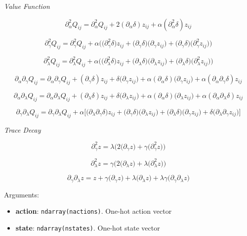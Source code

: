 \emph{Value Function}

\[
\partial^2_\alpha Q_{ij} = \partial^2_\alpha Q_{ij} + 2(\partial_\alpha \delta) z_{ij} + \alpha (\partial^2_\alpha \delta) z_{ij}
\]

\[
\partial^2_\gamma Q_{ij} = \partial^2_\gamma Q_{ij} +  \alpha \Big( \big(\partial^2_\gamma \delta \big)z_{ij} +  \big(\partial_\gamma \delta \big) \big(\partial_\gamma z_{ij}\big) + \big(\partial_\gamma \delta \big) \big(\partial^2_\gamma z_{ij}\big) \Big)
\]

\[
\partial^2_\lambda Q_{ij} = \partial^2_\lambda Q_{ij} +  \alpha \Big( \big(\partial^2_\lambda \delta \big)z_{ij} +  \big(\partial_\lambda \delta \big) \big(\partial_\lambda z_{ij}\big) + \big(\partial_\lambda \delta \big) \big(\partial^2_\lambda z_{ij}\big) \Big)
\]

\[
\partial_\alpha \partial_\gamma Q_{ij} =  \partial_\alpha \partial_\gamma Q_{ij} + (\partial_\gamma \delta) z_{ij} + \delta \big(\partial_\gamma z_{ij} \big) + \alpha(\partial_\alpha \delta)\big(\partial_\gamma z_{ij} \big) + \alpha(\partial_\alpha \partial_\gamma \delta) z_{ij}
\]

\[
\partial_\alpha \partial_\lambda Q_{ij} = \partial_\alpha \partial_\lambda Q_{ij} + (\partial_\lambda \delta) z_{ij} + \delta \big(\partial_\lambda z_{ij} \big) + \alpha(\partial_\alpha \delta)\big(\partial_\lambda z_{ij} \big) + \alpha(\partial_\alpha \partial_\lambda \delta) z_{ij}
\]

\[
\partial_\gamma \partial_\lambda Q_{ij} = \partial_\gamma \partial_\lambda Q_{ij} + \alpha \Big[ \big( \partial_\lambda \partial_\gamma \delta \big) z_{ij} + \big( \partial_\gamma \delta \big)\big(\partial_\lambda z_{ij} \big) + \big(\partial_\lambda \delta \big)\big(\partial_\gamma z_{ij} \big) + \delta \big(\partial_\lambda \partial_\gamma z_{ij} \big) \Big]
\]

\emph{Trace Decay}

\[
\partial^2_\gamma z = \lambda \Big( 2\big(\partial_\gamma z\big) + \gamma \big(\partial^2_\gamma z \big) \Big)
\]

\[
\partial^2_\lambda z = \gamma \Big( 2\big(\partial_\lambda z\big) + \lambda \big(\partial^2_\lambda z \big) \Big)
\]

\[
\partial_\gamma \partial_\lambda z = z  + \gamma \big( \partial_\gamma z \big) + \lambda \big( \partial_\lambda z \big) + \lambda \gamma \big( \partial_\gamma \partial_\lambda z \big)
\]

Arguments:

\begin{itemize}
\tightlist
\item
  \textbf{action}: \texttt{ndarray(nactions)}. One-hot action vector
\item
  \textbf{state}: \texttt{ndarray(nstates)}. One-hot state vector
\end{itemize}

